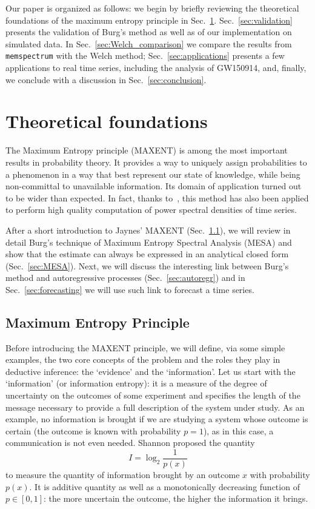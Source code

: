 \documentclass[epj,nopacs]{svjour}
\begin{document}
Our paper is organized as follows: we begin by briefly reviewing the theoretical foundations of the maximum entropy principle in Sec.~\ref{sec:foundations}. Sec.~\ref{sec:validation} presents the validation of Burg's method as well as of our implementation on simulated data. In Sec.~\ref{sec:Welch_comparison} we compare the results from \texttt{memspectrum} with the Welch method; Sec.~\ref{sec:applications} presents a few applications to real time series, including the analysis of GW150914, and, finally, we conclude with a discussion in Sec.~\ref{sec:conclusion}.


\section{Theoretical foundations}\label{sec:foundations}
The Maximum Entropy principle (MAXENT) is among the most important results in probability theory. It provides a way to uniquely assign probabilities to a phenomenon in a way that best represent our state of knowledge, while being non-committal to unavailable information. Its domain of application turned out to be wider than expected. In fact, thanks to~\cite{burg1975maximum}, this method has also been applied to perform high quality computation of power spectral densities of time series.

After a short introduction to Jaynes' MAXENT (Sec.~\ref{sec:MAXENT}), we will review in detail Burg's technique of Maximum Entropy Spectral Analysis (MESA) and show that the estimate can always be expressed in an analytical closed form (Sec.~\ref{sec:MESA}).
Next, we will discuss the interesting link between Burg's method and autoregressive processes (Sec.~\ref{sec:autoregr}) and in Sec.~\ref{sec:forecasting} we will use such link to forecast a time series.

\subsection{Maximum Entropy Principle} \label{sec:MAXENT}

Before introducing the MAXENT principle, we will define, via some simple examples, the two core concepts of the problem and the roles they play in deductive inference: the `evidence' and the `information'.
Let us start with the `information' (or information entropy): it is a measure of the degree of uncertainty on the outcomes of some experiment and specifies the length of the message necessary to provide a full description of the system under study. As an example, no information is brought if we are studying a system whose outcome is certain (the outcome is known with probability $p = 1$), as in this case, a communication is not even needed.
Shannon \cite{Shannon}  proposed the quantity
\begin{equation}\label{eq:information}
    I = \log_2 \frac{1}{p(x)}
\end{equation}
to measure the quantity of information brought by an outcome $x$ with probability $p(x)$. It is additive quantity as well as a monotonically decreasing function of $p \in [0, 1]$: the more uncertain the outcome, the higher the information it brings.
\end{document}
